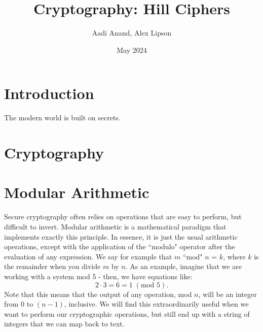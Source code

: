 \documentclass{article}
\title{Cryptography: Hill Ciphers}
\author{Aadi Anand, Alex Lipson}
\date{May 2024}
\begin{document}
\maketitle

\section{Introduction}

The modern world is built on secrets.

\section{Cryptography}

\section{Modular Arithmetic}

Secure cryptography often relies on operations that are easy to perform, but difficult to invert. Modular arithmetic is a mathematical paradigm that implements exactly this principle. In essence, it is just the usual arithmetic operations, except with the application of the ``modulo" operator after the evaluation of any expression. We say for example that $m$ ``mod" $n$ = $k$, where $k$ is the remainder when you divide $m$ by $n$. As an example, imagine that we are working with a system mod 5 - then, we have equations like:
\[
    2 \cdot 3 = 6 = 1 \; (\text{mod } 5).
\]
Note that this means that the output of any operation, mod $n$, will be an integer from $0$ to $(n - 1)$, inclusive. We will find this extraordinarily useful when we want to perform our cryptographic operations, but still end up with a string of integers that we can map back to text.
\end{document}
